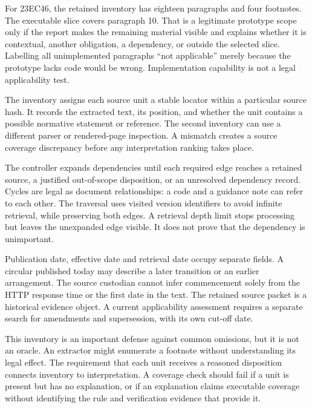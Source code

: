 For 23EC46, the retained inventory has eighteen paragraphs and four footnotes.
The executable slice covers paragraph 10. That is a legitimate prototype scope
only if the report makes the remaining material visible and explains whether it
is contextual, another obligation, a dependency, or outside the selected slice.
Labelling all unimplemented paragraphs ``not applicable'' merely because the
prototype lacks code would be wrong. Implementation capability is not a legal
applicability test.

The inventory assigns each source unit a stable locator within a particular
source hash. It records the extracted text, its position, and whether the unit
contains a possible normative statement or reference. The second inventory can
use a different parser or rendered-page inspection. A mismatch creates a source
coverage discrepancy before any interpretation ranking takes place.


The controller expands dependencies until each required edge reaches a retained
source, a justified out-of-scope disposition, or an unresolved dependency record.
Cycles are legal as document relationships: a code and a guidance note can refer
to each other. The traversal uses visited version identifiers to avoid infinite
retrieval, while preserving both edges. A retrieval depth limit stops processing
but leaves the unexpanded edge visible. It does not prove that the dependency is
unimportant.

Publication date, effective date and retrieval date occupy separate fields. A
circular published today may describe a later transition or an earlier
arrangement. The source custodian cannot infer commencement solely from the HTTP
response time or the first date in the text. The retained source packet is a
historical evidence object. A current applicability assessment requires a
separate search for amendments and supersession, with its own cut-off date.

This inventory is an important defense against common omissions, but it is not
an oracle. An extractor might enumerate a footnote without understanding its
legal effect. The requirement that each unit receives a reasoned disposition
connects inventory to interpretation. A coverage check should fail if a unit is
present but has no explanation, or if an explanation claims executable coverage
without identifying the rule and verification evidence that provide it.

